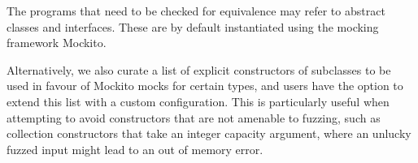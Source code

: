 \documentclass[sigconf,review,anonymous]{acmart}
\begin{document}
The programs that need to be checked for equivalence may refer to
abstract classes and interfaces. These are by default instantiated
using the mocking framework Mockito.

Alternatively, we also curate a
list of explicit constructors
of subclasses to be used in favour of Mockito mocks for certain types, and users
have the option to extend this list with a custom configuration.
%
This is particularly useful when attempting to avoid constructors that are not amenable to fuzzing, such as
collection constructors that take an integer capacity argument, where an
unlucky fuzzed input might lead to an out of memory error.





%
\end{document}

